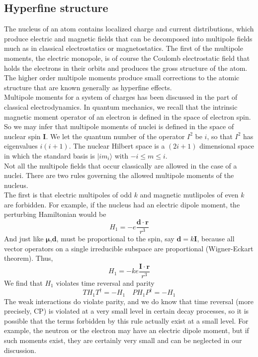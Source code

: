 \subsection{Hyperfine structure}
The nucleus of an atom contains localized charge and current distributions, which produce electric and magnetic fields that can be decomposed into multipole fields much as in classical electrostatics or magnetostatics.
The first of the multipole moments, the electric monopole, is of course the Coulomb electrostatic field that holds the electrons in their orbits and produces the gross structure of the atom.
The higher order multipole moments produce small corrections to the atomic structure that are known generally as hyperfine effects.\\
Multipole moments for a system of charges has been discussed in the part of classical electrodynamics. In quantum mechanics, we recall that the intrinsic magnetic moment operator of an electron is defined in the space of electron spin. So we may infer that multipole moments of nuclei is defined in the space of nuclear spin $\bm{I}$. 
We let the quantum number of the operator $I^2$ be $i$, so that $I^2$ has eigenvalues $i(i+1)$. The nuclear Hilbert space is a  $(2i+1)$ dimensional space in which the standard basis is $|im_i\rangle$ with $-i \leq m \leq i$.\\
Not all the multipole fields that occur classically are allowed in the case of a nuclei. There are two rules governing the allowed multipole moments of the nucleus.\\ 
The first is that electric multipoles of odd $k$ and magnetic mutlipoles of even $k$ are forbidden. For example, if the nucleus had an electric dipole moment, the perturbing Hamiltonian would be
\[H_1 = -e \frac{\bm{d}\cdot\bm{r}}{r^3}\]
And just like $\bm{\mu}$,$\bm{d}$, must be proportional to the spin, say $\bm{d} = k\bm{I}$, because all vector operators on a single irreducible subspace are proportional (Wigner-Eckart theorem). Thus,
\[H_1 = -ke \frac{\bm{I}\cdot\bm{r}}{r^3}\]
We find that $H_1$ violates time reversal and parity
\[T H_1 T^{\dagger} = -H_1 \quad P H_1 P^{\dagger} = -H_1\]
The weak interactions do violate parity, and we do know that time reversal (more precisely, CP) is violated at a very small  level in certain decay processes, so it is possible that the terms forbidden by this rule actually exist at a small level. For example, the neutron or the electron may have an electric dipole moment, but if such moments exist, they are certainly very small and can be neglected in our discussion.\\
